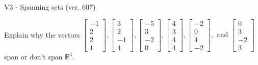 \begin{exercise}
  \begin{exerciseTitle}V3 - Spanning sets (ver. 607)\end{exerciseTitle}
  \begin{exerciseStatement}
    Explain why the vectors \(\left[\begin{array}{r}
-1 \\
2 \\
2 \\
1
\end{array}\right] , \left[\begin{array}{r}
3 \\
2 \\
-1 \\
4
\end{array}\right] , \left[\begin{array}{r}
-5 \\
3 \\
-2 \\
0
\end{array}\right] , \left[\begin{array}{r}
4 \\
3 \\
4 \\
4
\end{array}\right] , \left[\begin{array}{r}
-2 \\
0 \\
4 \\
-2
\end{array}\right] , \text{ and } \left[\begin{array}{r}
0 \\
3 \\
-2 \\
3
\end{array}\right]\) span or don't span \(\mathbb{R}^4\). 
	



\end{exerciseStatement}
\end{exercise}
